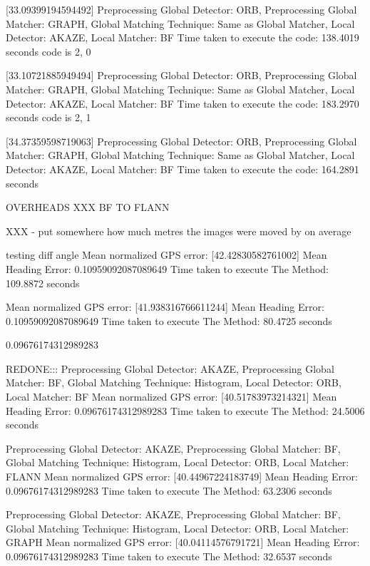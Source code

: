 [33.09399194594492]
Preprocessing Global Detector: ORB, Preprocessing Global Matcher: GRAPH, Global Matching Technique: Same as Global Matcher, Local Detector: AKAZE, Local Matcher: BF
Time taken to execute the code: 138.4019 seconds
code is 2, 0


[33.10721885949494]
Preprocessing Global Detector: ORB, Preprocessing Global Matcher: GRAPH, Global Matching Technique: Same as Global Matcher, Local Detector: AKAZE, Local Matcher: BF
Time taken to execute the code: 183.2970 seconds
code is 2, 1


[34.37359598719063]
Preprocessing Global Detector: ORB, Preprocessing Global Matcher: GRAPH, Global Matching Technique: Same as Global Matcher, Local Detector: AKAZE, Local Matcher: BF
Time taken to execute the code: 164.2891 seconds

OVERHEADS XXX BF TO FLANN

XXX - put somewhere how much metres the images were moved by on average







testing diff angle 
Mean normalized GPS error: [42.42830582761002]
Mean Heading Error: 0.10959092087089649
Time taken to execute The Method: 109.8872 seconds

Mean normalized GPS error: [41.938316766611244]
Mean Heading Error: 0.10959092087089649
Time taken to execute The Method: 80.4725 seconds


0.09676174312989283 


REDONE:::
Preprocessing Global Detector: AKAZE, Preprocessing Global Matcher: BF, Global Matching Technique: Histogram, Local Detector: ORB, Local Matcher: BF
Mean normalized GPS error: [40.51783973214321]
Mean Heading Error: 0.09676174312989283
Time taken to execute The Method: 24.5006 seconds


Preprocessing Global Detector: AKAZE, Preprocessing Global Matcher: BF, Global Matching Technique: Histogram, Local Detector: ORB, Local Matcher: FLANN
Mean normalized GPS error: [40.44967224183749]
Mean Heading Error: 0.09676174312989283
Time taken to execute The Method: 63.2306 seconds


Preprocessing Global Detector: AKAZE, Preprocessing Global Matcher: BF, Global Matching Technique: Histogram, Local Detector: ORB, Local Matcher: GRAPH
Mean normalized GPS error: [40.04114576791721]
Mean Heading Error: 0.09676174312989283
Time taken to execute The Method: 32.6537 seconds



